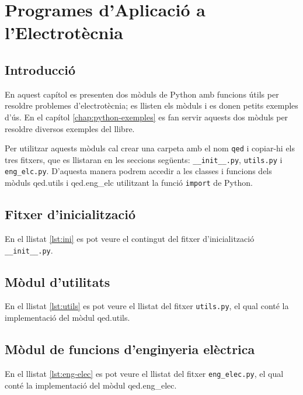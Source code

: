 \chapter{Programes d'Aplicació a l'Electrotècnia}\label{chap:python-programes}

\section{Introducció}

En aquest capítol es presenten dos mòduls de Python amb funcions útils per resoldre problemes d'electrotècnia; es llisten els  mòduls i es donen petits exemples d'ús. En el capítol \ref{chap:python-exemples} es fan servir aquests dos mòduls per resoldre diversos exemples del llibre.

Per utilitzar aquests mòduls cal crear una carpeta amb el nom \texttt{qed} i copiar-hi els tres fitxers, que es llistaran en les seccions següents: \texttt{\_\_init\_\_.py}, \texttt{utils.py} i \texttt{eng\_elc.py}. D'aquesta manera podrem accedir a les classes i funcions dels mòduls qed.utils i qed.eng\_elc utilitzant la funció \texttt{import} de Python.



\section{Fitxer d'inicialització}
En el llistat \vref{lst:ini} es pot veure el contingut del fitxer d'inicialització  \texttt{\_\_init\_\_.py}.



\section{Mòdul d'utilitats}
En el llistat \vref{lst:utils} es pot veure el llistat del fitxer \texttt{utils.py}, el qual conté la implementació del mòdul qed.utils.



\section{Mòdul de funcions d'enginyeria elèctrica}
En el llistat \vref{lst:eng-elec} es pot veure el llistat del fitxer \texttt{eng\_elec.py}, el qual conté la implementació del mòdul qed.eng\_elec.

